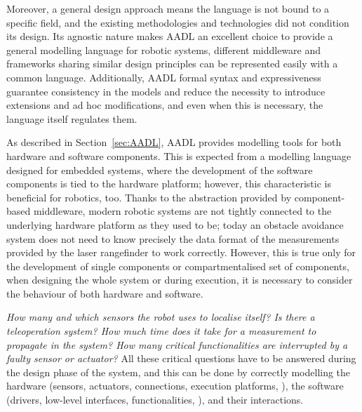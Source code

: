 Moreover, a general design approach means the language is not bound to a specific field, and the existing methodologies and technologies did not condition its design. Its agnostic nature makes AADL an excellent choice to provide a general modelling language for robotic systems, different middleware and frameworks sharing similar design principles can be represented easily with a common language. Additionally, AADL formal syntax and expressiveness guarantee consistency in the models and reduce the necessity to introduce extensions and ad hoc modifications, and even when this is necessary, the language itself regulates them.

As described in Section~\ref{sec:AADL}, AADL provides modelling tools for both hardware and software components. This is expected from a modelling language designed for embedded systems, where the development of the software components is tied to the hardware platform; however, this characteristic is beneficial for robotics, too. Thanks to the abstraction provided by component-based middleware, modern robotic systems are not tightly connected to the underlying hardware platform as they used to be; today an obstacle avoidance system does not need to know precisely the data format of the measurements provided by the laser rangefinder to work correctly. However, this is true only for the development of single components or compartmentalised set of components, when designing the whole system or during execution, it is necessary to consider the behaviour of both hardware and software. 

\textit{How many and which sensors the robot uses to localise itself? Is there a teleoperation system? How much time does it take for a measurement to propagate in the system? How many critical functionalities are interrupted by a faulty sensor or actuator?} All these critical questions have to be answered during the design phase of the system, and this can be done by correctly modelling the hardware (sensors, actuators, connections, execution platforms, \etc), the software (drivers, low-level interfaces, functionalities, \etc), and their interactions.


